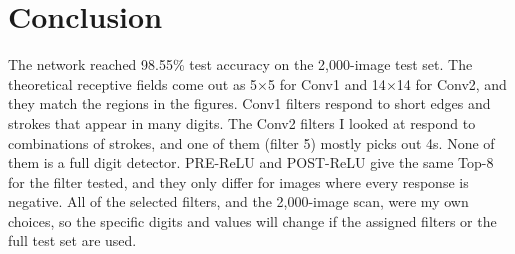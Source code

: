 \documentclass[12pt]{article}
\begin{document}
\section{Conclusion}

The network reached 98.55\% test accuracy on the 2,000-image test set. The theoretical receptive fields come out as 5$\times$5 for Conv1 and 14$\times$14 for Conv2, and they match the regions in the figures. Conv1 filters respond to short edges and strokes that appear in many digits. The Conv2 filters I looked at respond to combinations of strokes, and one of them (filter 5) mostly picks out 4s. None of them is a full digit detector. PRE-ReLU and POST-ReLU give the same Top-8 for the filter tested, and they only differ for images where every response is negative. All of the selected filters, and the 2,000-image scan, were my own choices, so the specific digits and values will change if the assigned filters or the full test set are used.
\end{document}
